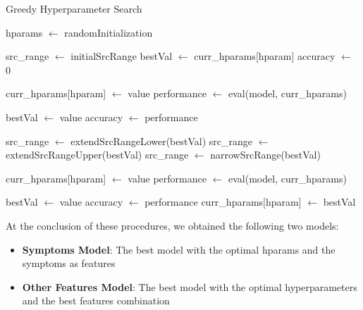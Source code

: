 \begin{algorithm}[h]
	\caption{Greedy Hyperparameter Search}\label{alg:greedy_hyperparameter_search}
	\begin{algorithmic}[1]
		\State hparams $\gets$ randomInitialization

		\State src\_range $\gets$ initialSrcRange
		\State bestVal $\gets$ curr\_hparams[hparam]
		\State accuracy $\gets$ 0

		\State curr\_hparams[hparam] $\gets$ value
		\State performance $\gets$ eval(model, curr\_hparams)

		\State bestVal $\gets$ value
		\State accuracy $\gets$ performance
		\EndIf
		\EndFor

		\State src\_range $\gets$ extendSrcRangeLower(bestVal)
		\State src\_range $\gets$ extendSrcRangeUpper(bestVal)
		\Else
		\State src\_range $\gets$ narrowSrcRange(bestVal)
		\EndIf

		\State curr\_hparams[hparam] $\gets$ value
		\State performance $\gets$ eval(model, curr\_hparams)

		\State bestVal $\gets$ value
		\State accuracy $\gets$ performance
		\EndIf
		\EndFor
		\State curr\_hparams[hparam] $\gets$ bestVal
		\EndFor
	\end{algorithmic}
\end{algorithm}

\noindent
At the conclusion of these procedures, we obtained the following two models:\\

\begin{itemize}
	\setlength\itemsep{0.4em} %
	\item \textbf{Symptoms Model}: The best model with the optimal hparams and the symptoms as features
	\item \textbf{Other Features Model}: The best model with the optimal hyperparameters and the best features combination
\end{itemize}
\vspace{0.4cm}

